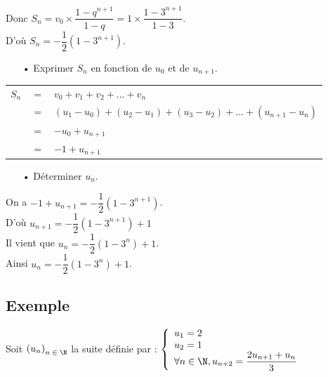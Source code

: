 Donc $S_n = v_0 \times \dfrac{1 - q^{n+1}}{1 - q} = 1 \times \dfrac{1-3^{n+1}}{1 - 3}$. \\

D'où $S_n = -\dfrac{1}{2}\left(1-3^{n+1}\right)$. 

\vspace*{.3cm}

\begin{itemize}
\item[•] Exprimer $S_n$ en fonction de $u_0$ et de $u_{n+1}$. \\
\end{itemize}

\begin{tabular}{lll}
$S_n$ & $ = $ & $ v_0 + v_1 + v_2 + ... + v_n$ \\
& $=$ & $\left(u_1 - u_0\right) + \left(u_2-u_1\right) + \left(u_3 - u_2\right) + ... + \left(u_{n+1} - u_n\right)$ \\
& $=$ & $-u_0 + u_{n+1}$ \\
& $=$ & $-1 + u_{n+1}$ \\
\end{tabular}

\vspace*{.3cm}

\begin{itemize}
\item[•] Déterminer $u_n$. \\
\end{itemize}

On a $-1 + u_{n+1} = -\dfrac{1}{2}\left(1 - 3^{n+1}\right)$. \\

D'où $u_{n+1} = -\dfrac{1}{2}\left(1-3^{n+1}\right) + 1$ \\

Il vient que $u_n = -\dfrac{1}{2}\left(1 - 3^n\right) + 1$. \\

Ainsi $u_n = -\dfrac{1}{2}\left(1 - 3^n\right) + 1$. \\

\newpage

\subsection{Exemple }

Soit $\left(u_n\right)_{n\; \in \; \N}$ la suite définie par : $\left\{
  \begin{array}{lll}
    u_1 = 2 \\
    u_2 = 1 \\
    \forall n \in \N, u_{n+2} = \dfrac{2u_{n+1} + u_n}{3}
  \end{array}
\right.$

